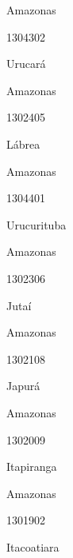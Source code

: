 \documentclass[
  letterpaper,
]{report}
\begin{document}
Amazonas

\n      

1304302

\n      

Urucará

\n    

\n    

\n      

Amazonas

\n      

1302405

\n      

Lábrea

\n    

\n    

\n      

Amazonas

\n      

1304401

\n      

Urucurituba

\n    

\n    

\n      

Amazonas

\n      

1302306

\n      

Jutaí

\n    

\n    

\n      

Amazonas

\n      

1302108

\n      

Japurá

\n    

\n    

\n      

Amazonas

\n      

1302009

\n      

Itapiranga

\n    

\n    

\n      

Amazonas

\n      

1301902

\n      

Itacoatiara
\end{document}

